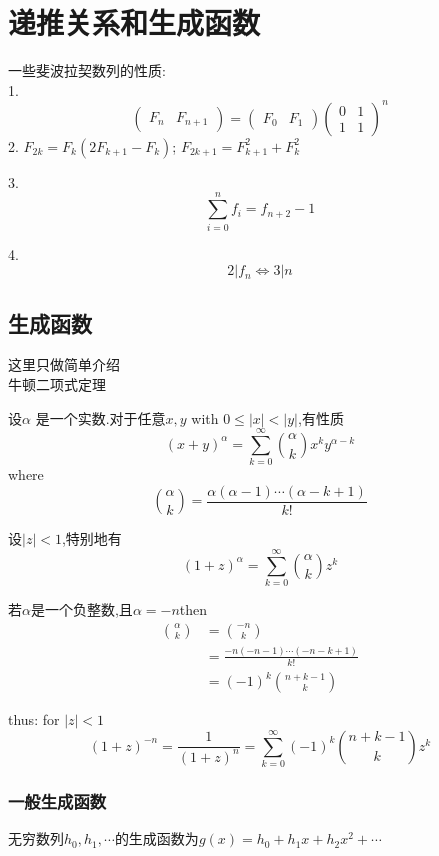 \section{递推关系和生成函数}
一些斐波拉契数列的性质:\\
1.
$$
\begin{pmatrix}
  F_n &F_{n+1}
\end{pmatrix}=
\begin{pmatrix}
  F_0 &F_1
\end{pmatrix}
\begin{pmatrix}
  0 &1\\1&1
\end{pmatrix}^n
$$
2.
$F_{2k}=F_k(2F_{k+1}-F_k)$; 
$F_{2k+1}=F_{k+1}^2+F_{k}^2$

3.
$$
\sum_{i=0}^{n} f_i=f_{n+2}-1
$$

4.
$$
2|f_n\iff3|n
$$

\subsection{生成函数}
这里只做简单介绍\\
牛顿二项式定理
\begin{theorem}
  设$\alpha$ 是一个实数.对于任意$x,y$ with $0\le |x| <|y|$,有性质
  $$
  (x+y)^{\alpha} =\sum_{k=0}^{\infty} \binom{\alpha}{k} x^{k} y^{\alpha-k}
  $$
  where
  $$
  \binom{\alpha} {k}=\frac{\alpha (\alpha-1) \cdots (\alpha -k+1)}{k!}
  $$
\end{theorem}
设$|z|<1$,特别地有
$$
(1+z)^{\alpha} =\sum_{k=0}^{\infty} \binom{\alpha}{k} z^k
$$

\begin{proposition}
  若$\alpha$是一个负整数,且$\alpha = -n$then
  $$
  \begin{aligned}
    \binom{\alpha}{k}&=\binom{-n}{k}\\
    &=\frac{-n (-n-1)\cdots (-n-k+1)}{k!}\\
    &=(-1)^k\binom{n+k-1}{k}
  \end{aligned}
  $$
\end{proposition}
thus: for $|z|<1$
$$
(1+z)^{-n}=\frac{1}{(1+z)^n}=\sum_{k=0}^{\infty}(-1)^k \binom{n+k-1}{k} z^k
$$

\subsubsection{一般生成函数}
无穷数列$h_0,h_1,\cdots $的生成函数为$g(x)=h_0+h_1 x+h_2x^2+\cdots $
\\


